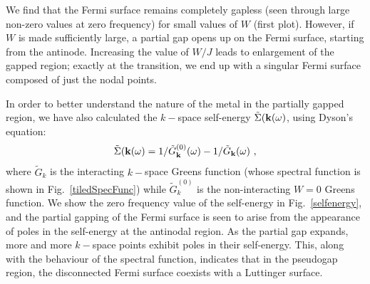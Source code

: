 \documentclass[reprint,hidelinks,onecolumn]{revtex4-2}
\begin{document}
We find that the Fermi surface remains completely gapless (seen through large non-zero values at zero frequency) for small values of \(W\) (first plot). However, if \(W\) is made sufficiently large, a partial gap opens up on the Fermi surface, starting from the antinode. Increasing the value of \(W/J\) leads to enlargement of the gapped region; exactly at the transition, we end up with a singular Fermi surface composed of just the nodal points.

In order to better understand the nature of the metal in the partially gapped region, we have also calculated the \(k-\)space self-energy \(\tilde \Sigma({\bf k}(\omega)\), using Dyson's equation:
\begin{equation}\begin{aligned}
	\tilde \Sigma({\bf k}(\omega) = 1/\tilde G^{(0)}_{\bf k}(\omega) - 1/\tilde G_{\bf k}(\omega)~,
\end{aligned}\end{equation}
where \(\tilde G_k\) is the interacting \(k-\)space Greens function (whose spectral function is shown in Fig.~\ref{tiledSpecFunc}) while \(\tilde G_k^{(0)}\) is the non-interacting \(W=0\) Greens function. We show the zero frequency value of the self-energy in Fig.~\ref{selfenergy}, and the partial gapping of the Fermi surface is seen to arise from the appearance of poles in the self-energy at the antinodal region. As the partial gap expands, more and more \(k-\)space points exhibit poles in their self-energy. This, along with the behaviour of the spectral function, indicates that in the pseudogap region, the disconnected Fermi surface coexists with a Luttinger surface.
\end{document}
